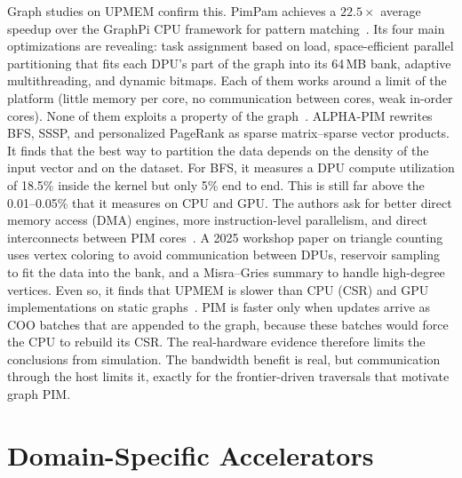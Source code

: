 \documentclass[journal,onecolumn]{IEEEtran}
\begin{document}
Graph studies on UPMEM confirm this. PimPam achieves a $22.5\times$ average speedup over the GraphPi CPU framework for pattern matching~\cite{cai2024pimpam}. Its four main optimizations are revealing: task assignment based on load, space-efficient parallel partitioning that fits each DPU's part of the graph into its 64\,MB bank, adaptive multithreading, and dynamic bitmaps. Each of them works around a limit of the platform (little memory per core, no communication between cores, weak in-order cores). None of them exploits a property of the graph~\cite{cai2024pimpam}. ALPHA-PIM rewrites BFS, SSSP, and personalized PageRank as sparse matrix--sparse vector products. It finds that the best way to partition the data depends on the density of the input vector and on the dataset. For BFS, it measures a DPU compute utilization of 18.5\% inside the kernel but only 5\% end to end. This is still far above the 0.01--0.05\% that it measures on CPU and GPU. The authors ask for better direct memory access (DMA) engines, more instruction-level parallelism, and direct interconnects between PIM cores~\cite{barkhordar2025alphapim}. A 2025 workshop paper on triangle counting uses vertex coloring to avoid communication between DPUs, reservoir sampling to fit the data into the bank, and a Misra--Gries summary to handle high-degree vertices. Even so, it finds that UPMEM is slower than CPU (CSR) and GPU implementations on static graphs~\cite{asquini2025tc}. PIM is faster only when updates arrive as COO batches that are appended to the graph, because these batches would force the CPU to rebuild its CSR. The real-hardware evidence therefore limits the conclusions from simulation. The bandwidth benefit is real, but communication through the host limits it, exactly for the frontier-driven traversals that motivate graph PIM.

\section{Domain-Specific Accelerators}\label{sec:dsa}
\end{document}
